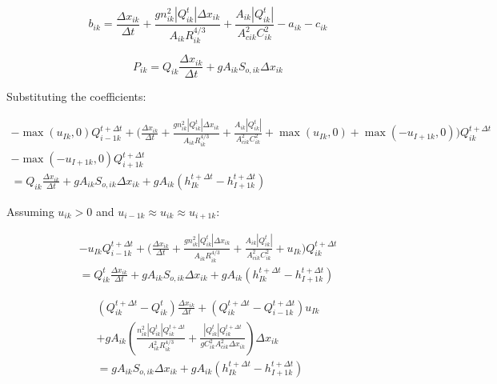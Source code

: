 \documentclass[11pt]{article}
\begin{document}
\begin{equation}
  b_{ik} = \frac{\Delta x_{ik}}{\Delta t} + \frac{g n_{ik}^2 |Q_{ik}^t| \Delta x_{ik}}{A_{ik} R_{ik}^{4/3}} + \frac{A_{ik} |Q_{ik}^t|}{A_{cik}^2 C_{ik}^2} - a_{ik} - c_{ik}
\end{equation}

\begin{equation}
  P_{ik} = Q_{ik} \frac{\Delta x_{ik}}{\Delta t} + g A_{ik} S_{o,ik} \Delta x_{ik}
\end{equation}

Substituting the coefficients:

\begin{equation}
  \begin{split}
    - \max(u_{Ik}, 0) Q_{i - 1k}^{t + \Delta t} + \biggl(\frac{\Delta x_{ik}}{\Delta t} + \frac{g n_{ik}^2 |Q_{ik}^t| \Delta x_{ik}}{A_{ik} R_{ik}^{4/3}} + \frac{A_{ik} |Q_{ik}^t|}{A_{cik}^2 C_{ik}^2} + \max(u_{Ik}, 0) + \max(-u_{I+1k}, 0) \biggr) Q_{ik}^{t + \Delta t} \\ - \max(-u_{I+1k}, 0) Q_{i + 1k}^{t + \Delta t} \\ =
    Q_{ik} \frac{\Delta x_{ik}}{\Delta t} + g A_{ik} S_{o,ik} \Delta x_{ik} + g A_{ik} (h_{Ik}^{t + \Delta t} - h_{I+1k}^{t + \Delta t})
  \end{split}
\end{equation}

Assuming $u_{ik} > 0$ and $u_{i-1k} \approx u_{ik} \approx u_{i+1k}$:

\begin{equation}
  \begin{split}
    -u_{Ik} Q_{i - 1k}^{t + \Delta t} + \biggl(\frac{\Delta x_{ik}}{\Delta t} + \frac{g n_{ik}^2 |Q_{ik}^t| \Delta x_{ik}}{A_{ik} R_{ik}^{4/3}} + \frac{A_{ik} |Q_{ik}^t|}{A_{cik}^2 C_{ik}^2} + u_{Ik} \biggr) Q_{ik}^{t + \Delta t} \\ =
    Q_{ik}^t \frac{\Delta x_{ik}}{\Delta t} + g A_{ik} S_{o,ik} \Delta x_{ik} + g A_{ik} (h_{Ik}^{t + \Delta t} - h_{I+1k}^{t + \Delta t})
  \end{split}
\end{equation}

\begin{equation}
  \begin{split}
    (Q_{ik}^{t + \Delta t} - Q_{ik}^t) \frac{\Delta x_{ik}}{\Delta t} + (Q_{ik}^{t + \Delta t} - Q_{i - 1k}^{t + \Delta t}) u_{Ik} \\ + g A_{ik} (\frac{n_{ik}^2 |Q_{ik}^t| Q_{ik}^{t + \Delta t}}{A_{ik}^2 R_{ik}^{4/3}} + \frac{|Q_{ik}^t| Q_{ik}^{t + \Delta t}}{g C_{ik}^2 A_{cik}^2 \Delta x_{ik}}) \Delta x_{ik} \\ =
    g A_{ik} S_{o,ik} \Delta x_{ik} + g A_{ik} (h_{Ik}^{t + \Delta t} - h_{I+1k}^{t + \Delta t})
  \end{split}
\end{equation}
\end{document}
